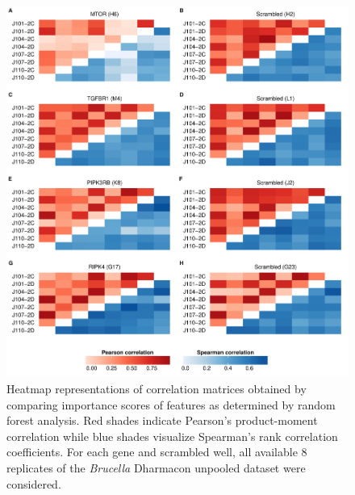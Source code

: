 \begin{knitrout}
\color{fgcolor}\begin{figure}

{\centering \includegraphics[width=\maxwidth]{figures/R/forest-corr-forest-corr-1} 

}

\caption[Heatmap representations of Pearson and Spearman correlation between feature importance scores from random forest analysis.]{Heatmap representations of correlation matrices obtained by comparing importance scores of features as determined by random forest analysis. Red shades indicate Pearson's product-moment correlation while blue shades visualize Spearman's rank correlation coefficients. For each gene and scrambled well, all available 8 replicates of the \textit{Brucella} Dharmacon unpooled dataset were considered.}\label{fig:forest-corr}
\end{figure}


\end{knitrout}

